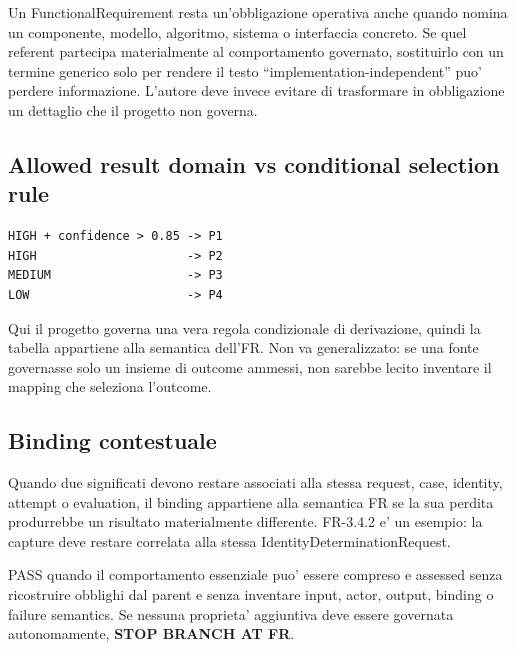 \documentclass[11pt,a4paper]{article}
\begin{document}
\begin{ddtacore}[title={Specifico non significa non-funzionale}]
Un FunctionalRequirement resta un'obbligazione operativa anche quando nomina un componente, modello, algoritmo, sistema o interfaccia concreto. Se quel referent partecipa materialmente al comportamento governato, sostituirlo con un termine generico solo per rendere il testo ``implementation-independent'' puo' perdere informazione. L'autore deve invece evitare di trasformare in obbligazione un dettaglio che il progetto non governa.
\end{ddtacore}

\subsection{Allowed result domain vs conditional selection rule}

\begin{ddtaexample}[title={DermaTriage - FR-02 come mapping governato}]
\begin{lstlisting}
HIGH + confidence > 0.85 -> P1
HIGH                     -> P2
MEDIUM                   -> P3
LOW                      -> P4
\end{lstlisting}
Qui il progetto governa una vera regola condizionale di derivazione, quindi la tabella appartiene alla semantica dell'FR. Non va generalizzato: se una fonte governasse solo un insieme di outcome ammessi, non sarebbe lecito inventare il mapping che seleziona l'outcome.
\end{ddtaexample}

\subsection{Binding contestuale}

Quando due significati devono restare associati alla stessa request, case, identity, attempt o evaluation, il binding appartiene alla semantica FR se la sua perdita produrrebbe un risultato materialmente differente. FR-3.4.2 e' un esempio: la capture deve restare correlata alla stessa IdentityDeterminationRequest.

\begin{ddtacheck}[title={Gate D3 - FR + STOP}]
PASS quando il comportamento essenziale puo' essere compreso e assessed senza ricostruire obblighi dal parent e senza inventare input, actor, output, binding o failure semantics. Se nessuna proprieta' aggiuntiva deve essere governata autonomamente, \textbf{STOP BRANCH AT FR}.
\end{ddtacheck}
\end{document}

